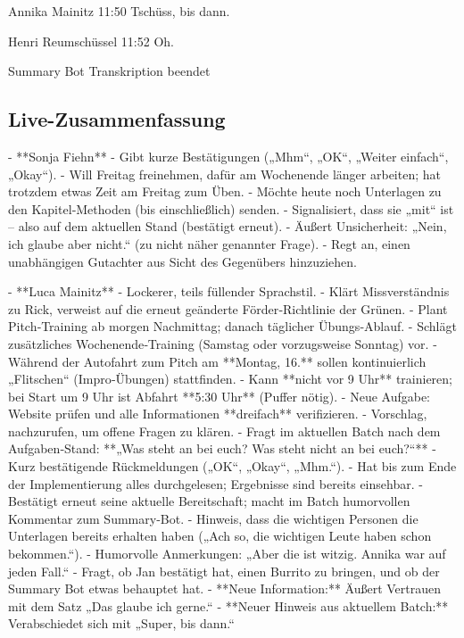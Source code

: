 Annika Mainitz   11:50
Tschüss, bis dann.

Henri Reumschüssel   11:52
Oh.

Summary Bot Transkription beendet


\subsection{Live-Zusammenfassung}
\label{app:Daily2_live}
- **Sonja Fiehn**  
  - Gibt kurze Bestätigungen („Mhm“, „OK“, „Weiter einfach“, „Okay“).  
  - Will Freitag freinehmen, dafür am Wochenende länger arbeiten; hat trotzdem etwas Zeit am Freitag zum Üben.  
  - Möchte heute noch Unterlagen zu den Kapitel‑Methoden (bis einschließlich) senden.  
  - Signalisiert, dass sie „mit“ ist – also auf dem aktuellen Stand (bestätigt erneut).  
  - Äußert Unsicherheit: „Nein, ich glaube aber nicht.“ (zu nicht näher genannter Frage).  
  - Regt an, einen unabhängigen Gutachter aus Sicht des Gegenübers hinzuziehen.  

- **Luca Mainitz**  
  - Lockerer, teils füllender Sprachstil.  
  - Klärt Missverständnis zu Rick, verweist auf die erneut geänderte Förder‑Richtlinie der Grünen.  
  - Plant Pitch‑Training ab morgen Nachmittag; danach täglicher Übungs‑Ablauf.  
  - Schlägt zusätzliches Wochenende‑Training (Samstag oder vorzugsweise Sonntag) vor.  
  - Während der Autofahrt zum Pitch am **Montag, 16.** sollen kontinuierlich „Flitschen“ (Impro‑Übungen) stattfinden.  
  - Kann **nicht vor 9 Uhr** trainieren; bei Start um 9 Uhr ist Abfahrt **5:30 Uhr** (Puffer nötig).  
  - Neue Aufgabe: Website prüfen und alle Informationen **dreifach** verifizieren.  
  - Vorschlag, nachzurufen, um offene Fragen zu klären.  
  - Fragt im aktuellen Batch nach dem Aufgaben‑Stand: **„Was steht an bei euch? Was steht nicht an bei euch?“**  
  - Kurz bestätigende Rückmeldungen („OK“, „Okay“, „Mhm.“).  
  - Hat bis zum Ende der Implementierung alles durchgelesen; Ergebnisse sind bereits einsehbar.  
  - Bestätigt erneut seine aktuelle Bereitschaft; macht im Batch humorvollen Kommentar zum Summary‑Bot.  
  - Hinweis, dass die wichtigen Personen die Unterlagen bereits erhalten haben („Ach so, die wichtigen Leute haben schon bekommen.“).  
  - Humorvolle Anmerkungen: „Aber die ist witzig. Annika war auf jeden Fall.“  
  - Fragt, ob Jan bestätigt hat, einen Burrito zu bringen, und ob der Summary Bot etwas behauptet hat.  
  - **Neue Information:** Äußert Vertrauen mit dem Satz „Das glaube ich gerne.“  
  - **Neuer Hinweis aus aktuellem Batch:** Verabschiedet sich mit „Super, bis dann.“  

